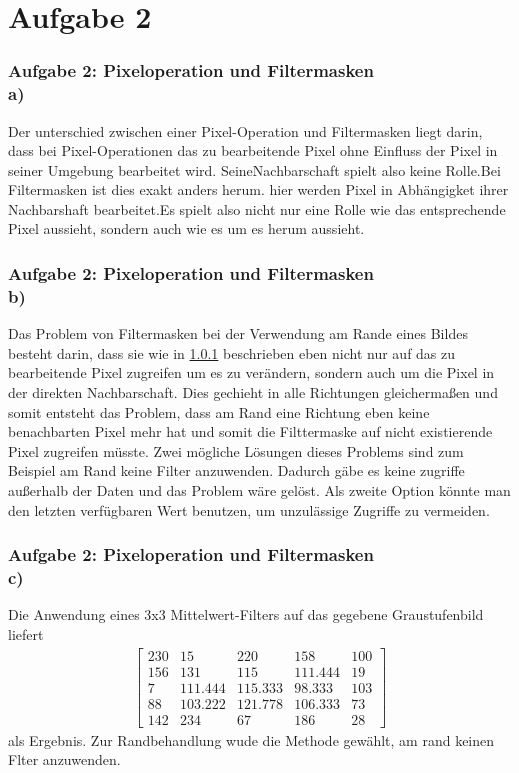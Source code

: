 \documentclass[accentcolor=tud1a,colorbacktitle,inverttitle,landscape,german,presentation,t]{tudbeamer}
\begin{document}
\section{Aufgabe 2}
	\begin{frame}
		\frametitle{Aufgabe 2: Pixeloperation und Filtermasken \\ a)}
			\label{2_a}
			Der unterschied zwischen einer Pixel-Operation und Filtermasken liegt darin, dass bei Pixel-Operationen das zu bearbeitende Pixel ohne Einfluss der Pixel in seiner Umgebung bearbeitet wird. SeineNachbarschaft spielt also keine Rolle.Bei Filtermasken ist dies exakt anders herum. hier werden Pixel in Abhängigket ihrer Nachbarshaft bearbeitet.Es spielt also nicht nur eine Rolle wie das entsprechende Pixel aussieht, sondern auch wie es um es herum aussieht.
	\end{frame}

	\begin{frame}
		\frametitle{Aufgabe 2: Pixeloperation und Filtermasken \\ b)}
		Das Problem von Filtermasken bei der Verwendung am Rande eines Bildes besteht darin, dass sie wie in \ref{2_a} beschrieben eben nicht nur auf das zu bearbeitende Pixel zugreifen um es  zu verändern, sondern auch um die Pixel in der direkten Nachbarschaft. Dies gechieht in alle Richtungen gleichermaßen und somit entsteht das Problem, dass am Rand eine Richtung eben keine benachbarten Pixel mehr hat und somit die Filttermaske auf nicht existierende Pixel zugreifen müsste. Zwei mögliche Lösungen dieses Problems sind zum Beispiel am Rand keine Filter anzuwenden. Dadurch gäbe es keine zugriffe außerhalb der Daten und das Problem wäre gelöst. Als zweite Option könnte man den letzten verfügbaren Wert benutzen, um unzulässige Zugriffe zu vermeiden. 
	\end{frame}
	
	\begin{frame}
		\frametitle{Aufgabe 2: Pixeloperation und Filtermasken \\ c)}
	
		Die Anwendung eines 3x3 Mittelwert-Filters auf das gegebene Graustufenbild liefert
		\begin{align*}
		\begin{bmatrix}
		230 & 15 & 220 & 158 & 100 \\
		156 & 131 & 115 & 111.444 & 19\\
		7 & 111.444 & 115.333 & 98.333 & 103\\
		88 & 103.222 & 121.778 & 106.333 & 73\\
		142 &234 & 67 & 186 & 28
		\end{bmatrix}
		\end{align*}
		als Ergebnis. Zur Randbehandlung wude die Methode gewählt, am rand keinen Flter anzuwenden.
	\end{frame}
\end{document}
